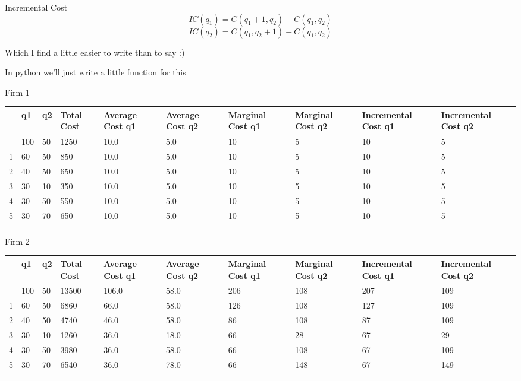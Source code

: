 \documentclass[
  ignorenonframetext,
]{beamer}
\begin{document}
\begin{frame}{Incremental Cost}
\label{incremental-cost}
\[IC(q_1) = C(q_1+1, q_2) - C(q_1,q_2)\]
\[IC(q_2) = C(q_1, q_2+1) - C(q_1,q_2)\]

Which I find a little easier to write than to say :)
\end{frame}

\begin{frame}
\begin{block}{In python we'll just write a little function for this}
\label{in-python-well-just-write-a-little-function-for-this}
\pause
\end{block}
\end{frame}

\begin{frame}{Firm 1}
\label{firm-1-2}
\begin{longtable}[]{@{}llllllllll@{}}
\toprule\noalign{}
& q1 & q2 & Total Cost & Average Cost q1 & Average Cost q2 & Marginal
Cost q1 & Marginal Cost q2 & Incremental Cost q1 & Incremental Cost
q2 \\
\midrule\noalign{}
\endhead
0 & 100 & 50 & 1250 & 10.0 & 5.0 & 10 & 5 & 10 & 5 \\
1 & 60 & 50 & 850 & 10.0 & 5.0 & 10 & 5 & 10 & 5 \\
2 & 40 & 50 & 650 & 10.0 & 5.0 & 10 & 5 & 10 & 5 \\
3 & 30 & 10 & 350 & 10.0 & 5.0 & 10 & 5 & 10 & 5 \\
4 & 30 & 50 & 550 & 10.0 & 5.0 & 10 & 5 & 10 & 5 \\
5 & 30 & 70 & 650 & 10.0 & 5.0 & 10 & 5 & 10 & 5 \\
\bottomrule\noalign{}
\end{longtable}
\end{frame}

\begin{frame}{Firm 2}
\label{firm-2-2}
\begin{longtable}[]{@{}llllllllll@{}}
\toprule\noalign{}
& q1 & q2 & Total Cost & Average Cost q1 & Average Cost q2 & Marginal
Cost q1 & Marginal Cost q2 & Incremental Cost q1 & Incremental Cost
q2 \\
\midrule\noalign{}
\endhead
0 & 100 & 50 & 13500 & 106.0 & 58.0 & 206 & 108 & 207 & 109 \\
1 & 60 & 50 & 6860 & 66.0 & 58.0 & 126 & 108 & 127 & 109 \\
2 & 40 & 50 & 4740 & 46.0 & 58.0 & 86 & 108 & 87 & 109 \\
3 & 30 & 10 & 1260 & 36.0 & 18.0 & 66 & 28 & 67 & 29 \\
4 & 30 & 50 & 3980 & 36.0 & 58.0 & 66 & 108 & 67 & 109 \\
5 & 30 & 70 & 6540 & 36.0 & 78.0 & 66 & 148 & 67 & 149 \\
\bottomrule\noalign{}
\end{longtable}
\end{frame}
\end{document}
